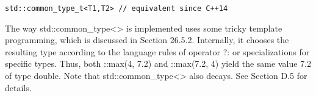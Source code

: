 \begin{lstlisting}[style=styleCXX]
std::common_type_t<T1,T2> // equivalent since C++14
\end{lstlisting}

The way std::common\_type<> is implemented uses some tricky template programming, which is discussed in Section 26.5.2. Internally, it chooses the resulting type according to the language rules of operator ?: or specializations for specific types. Thus, both ::max(4, 7.2) and ::max(7.2, 4) yield the same value 7.2 of type double. Note that std::common\_type<> also decays. See Section D.5 for details.





